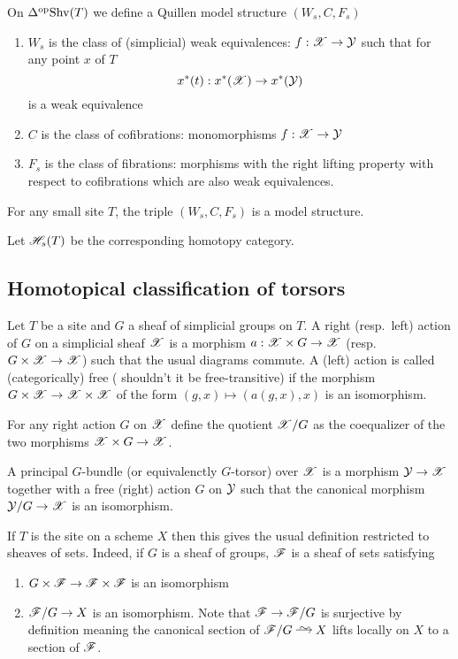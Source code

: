 \documentclass[12pt]{article}
\begin{document}
\begin{defn}
On $\Delta^{\mathrm{op}} \mathrm{Shv}(T)$ we define a Quillen model structure $(W_s, C, F_s)$ 
\begin{enumerate}
\item $W_s$ is the class of (simplicial) weak equivalences: $f : \mathscr{X} \to \mathcal{Y}$ such that for any point $x$ of $T$
\[ x^*(t) : x^*(\mathscr{X}) \to x^*(\mathcal{Y}) \]
is a weak equivalence
\item $C$ is the class of cofibrations: monomorphisms $f : \mathscr{X} \to \mathcal{Y}$ 
\item $F_s$ is the class of fibrations: morphisms with the right lifting property with respect to cofibrations which are also weak equivalences.
\end{enumerate}
\end{defn}

\begin{theorem}
For any small site $T$, the triple $(W_s, C, F_s)$ is a model structure. 
\end{theorem}

Let $\mathscr{H}_s(T)$ be the corresponding homotopy category. 

\subsection{Homotopical classification of torsors}

Let $T$ be a site and $G$ a sheaf of simplicial groups on $T$. A right (resp.\ left) action of $G$ on a simplicial sheaf $\mathscr{X}$ is a morphism $a : \mathscr{X} \times G \to \mathscr{X}$ (resp.\ $G \times \mathscr{X} \to \mathscr{X}$) such that the usual diagrams commute. A (left) action is called (categorically) free ({\color{red} shouldn't it be free-transitive}) if the morphism $G \times \mathscr{X} \to \mathscr{X} \times \mathscr{X}$ of the form $(g, x) \mapsto( a(g,x), x)$ is an isomorphism.
\par 
For any right action $G$ on $\mathscr{X}$ define the quotient $\mathscr{X} / G$ as the coequalizer of the two morphisms $\mathscr{X} \times G \to \mathscr{X}$. 
\par 
A principal $G$-bundle (or equivalenctly $G$-torsor) over $\mathscr{X}$ is a morphism $\mathcal{Y} \to \mathscr{X}$ together with a free (right) action $G$ on $\mathcal{Y}$ such that the canonical morphism $\mathcal{Y} / G \to \mathscr{X}$ is an isomorphism. 

\begin{rmk}
If $T$ is the \etale site on a scheme $X$ then this gives the usual definition restricted to sheaves of sets. Indeed, if $G$ is a sheaf of groups, $\mathscr{F}$ is a sheaf of sets satisfying
\begin{enumerate}
\item $G \times \mathscr{F} \to \mathscr{F} \times \mathscr{F}$ is an isomorphism
\item $\mathscr{F} / G \to X$ is an isomorphism. Note that $\mathscr{F} \to \mathscr{F} / G$ is surjective by definition meaning the canonical section of $\F / G \iso X$ lifts locally on $X$ to a section of $\mathscr{F}$.
\end{enumerate} 
\end{rmk}
\end{document}
